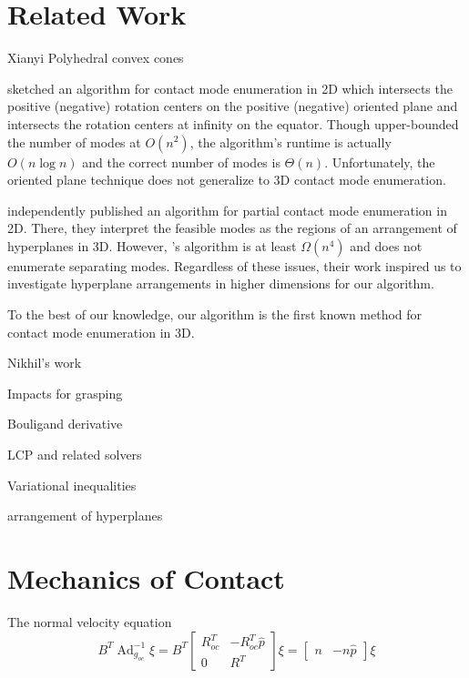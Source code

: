 \documentclass[conference]{IEEEtran}
\DeclareMathOperator{\adjoint}{Ad}
\newcommand{\TODO}[1]{{\color{red} {{#1}}  }}
\begin{document}
\section{Related Work}

\begin{inparaenum}
    \item \TODO{Xianyi} Polyhedral convex cones
    \item \citet{mason_mechanics_2001} sketched an algorithm for contact mode
    enumeration in 2D which intersects the positive (negative) rotation centers
    on the positive (negative) oriented plane and intersects the rotation
    centers at infinity on the equator. Though \citet{mason_mechanics_2001}
    upper-bounded the number of modes at $O(n^2)$, the algorithm's runtime is
    actually $O(n\log n)$ and the correct number of modes is $\Theta(n)$.
    Unfortunately, the oriented plane technique does not generalize to 3D
    contact mode enumeration.
    \item \citet{haas-heger_passive_2018} independently published an algorithm
    for partial contact mode enumeration in 2D. There, they interpret the
    feasible modes as the regions of an arrangement of hyperplanes in 3D.
    However, \citet{haas-heger_passive_2018}'s algorithm is at least
    $\Omega(n^4)$ and does not enumerate separating modes. Regardless of these
    issues, their work inspired us to investigate hyperplane arrangements in
    higher dimensions for our algorithm.
    \item To the best of our knowledge, our algorithm is the first known method
    for contact mode enumeration in 3D.
    \item Nikhil's work
    \item Impacts for grasping
    \item Bouligand derivative
    \item LCP and related solvers
    \item Variational inequalities
    \item arrangement of hyperplanes
\end{inparaenum}

\section{Mechanics of Contact}

\TODO{}

The normal velocity equation
\begin{equation}
B^T\adjoint_{g_{oc}}^{-1}\xi = 
B^T \begin{bmatrix}
        R_{oc}^T & -R_{oc}^T\widehat{p}\\
        0 & R^T
    \end{bmatrix}\xi = 
\begin{bmatrix} n & -n\widehat{p} \end{bmatrix}\xi
\end{equation}
\end{document}
